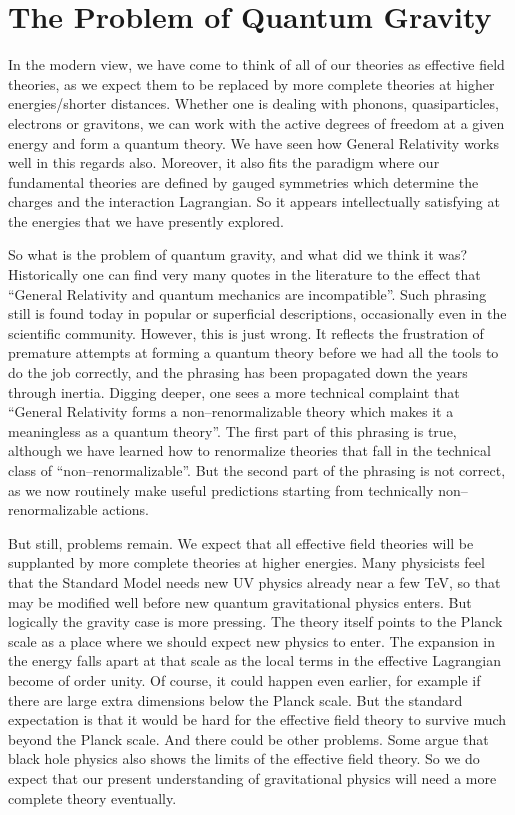\documentclass[12pt]{article}
\begin{document}
\newpage

\section{The Problem of Quantum Gravity}
\label{sec:QG} 

In the modern view, we have come to think of all of our theories as effective field theories, as we expect them to be replaced by more complete theories at higher energies/shorter distances. Whether one is dealing with phonons, quasiparticles, electrons or gravitons, we can work with the active degrees of freedom at a given energy and form a quantum theory. We have seen how General Relativity works well in this regards also. Moreover, it also fits the paradigm where our fundamental theories are defined by gauged symmetries which determine the charges and the interaction Lagrangian. So it appears intellectually satisfying at the energies that we have presently explored.

So what is the problem of quantum gravity, and what did we think it was? Historically one can find very many quotes in the literature to the effect that ``General Relativity and quantum mechanics are incompatible''.  Such phrasing still is found today in popular or superficial descriptions, occasionally even in the scientific community. However, this is just wrong. It reflects the frustration of premature attempts at forming a quantum theory before we had all the tools to do the job correctly, and the phrasing has been propagated down the years through inertia. Digging deeper, one sees a more technical complaint that ``General Relativity forms a non--renormalizable theory which makes it a meaningless as a quantum theory''. The first part of this phrasing is true, although we have learned how to renormalize theories that fall in the technical class of ``non--renormalizable''. But the second part of the phrasing is not correct, as we now routinely make useful predictions starting from technically non--renormalizable actions.

But still, problems remain. We expect that all effective field theories will be supplanted by more complete theories at higher energies. Many physicists feel that the Standard Model needs new UV physics already near a few TeV, so that may be modified well before new quantum gravitational physics enters. But logically the gravity case is more pressing. The theory itself points to the Planck scale as a place where we should expect new physics to enter. The expansion in the energy falls apart at that scale as the local terms in the effective Lagrangian become of order unity. Of course, it could happen even earlier, for example if there are large extra dimensions below the Planck scale. But the standard expectation is that it would be hard for the effective field theory to survive much beyond the Planck scale. And there could be other problems. Some argue that black hole physics also shows the limits of the effective field theory. So we do expect that our present understanding of gravitational physics will need a more complete theory eventually.
\end{document}
